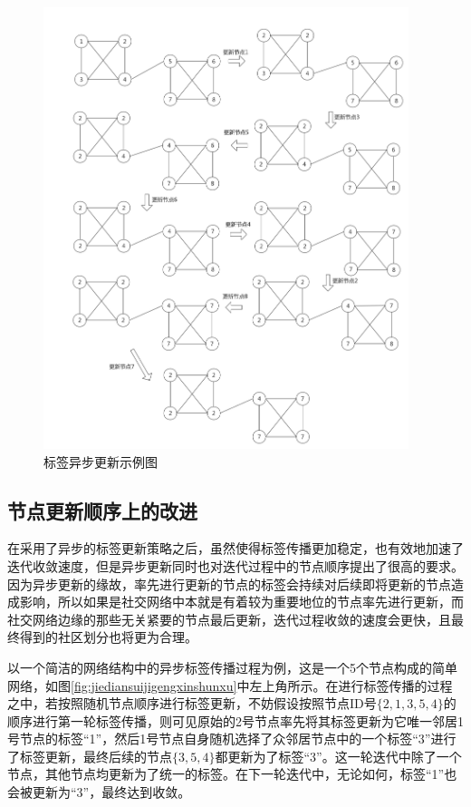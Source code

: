 \begin{figure}
  \centering
  \includegraphics[width=0.95\textwidth]{figures/yibugengxinshili}
  \caption{标签异步更新示例图}\label{fig:yibugengxinshili}
\end{figure}

\subsection{节点更新顺序上的改进}

在采用了异步的标签更新策略之后，虽然使得标签传播更加稳定，也有效地加速了迭代收敛速度，但是异步更新同时也对迭代过程中的节点顺序提出了很高的要求。因为异步更新的缘故，率先进行更新的节点的标签会持续对后续即将更新的节点造成影响，所以如果是社交网络中本就是有着较为重要地位的节点率先进行更新，而社交网络边缘的那些无关紧要的节点最后更新，迭代过程收敛的速度会更快，且最终得到的社区划分也将更为合理。

以一个简洁的网络结构中的异步标签传播过程为例，这是一个5个节点构成的简单网络，如图\ref{fig:jiediansuijigengxinshunxu}中左上角所示。在进行标签传播的过程之中，若按照随机节点顺序进行标签更新，不妨假设按照节点ID号$\{2,1,3,5,4 \} $的顺序进行第一轮标签传播，则可见原始的2号节点率先将其标签更新为它唯一邻居1号节点的标签“1”，然后1号节点自身随机选择了众邻居节点中的一个标签“3”进行了标签更新，最终后续的节点$\{3,5,4 \} $都更新为了标签“3”。这一轮迭代中除了一个节点，其他节点均更新为了统一的标签。在下一轮迭代中，无论如何，标签“1”也会被更新为“3”，最终达到收敛。

